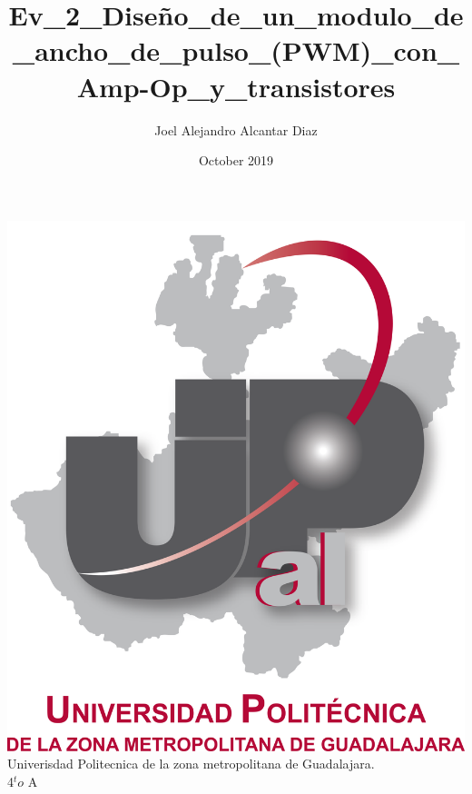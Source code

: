 \documentclass[letterpaper]{article}
\title{Ev\_2\_Diseño\_de\_un\_modulo\_de\_ancho\_de\_pulso\_(PWM)\_con\_Amp-Op\_y\_transistores}
\author{Joel Alejandro Alcantar Diaz}
\date{October 2019}
\begin{document}
\maketitle
\begin{center}
    \includegraphics[scale=0.5]{IMG/UPZMGlog.png}\\
    Univerisdad Politecnica de la zona metropolitana de Guadalajara.\\
    4$^to$ A
\end{center}
\newpage
\end{document}
